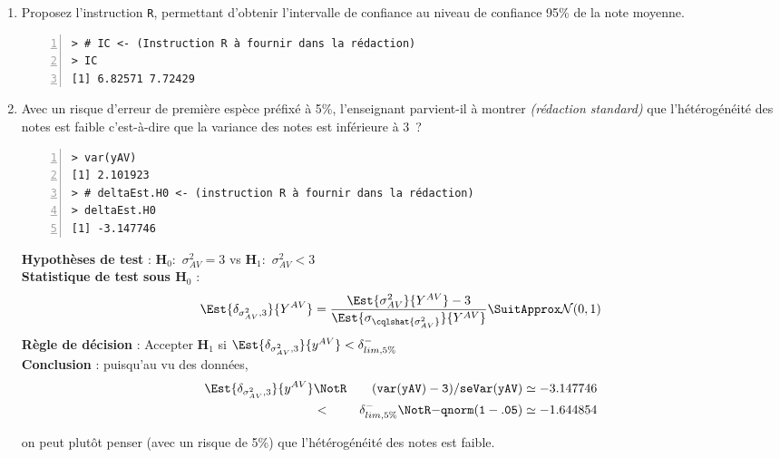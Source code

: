 \documentclass[10pt]{report}
\newcommand{\redstd}{\textit{(rédaction standard) }}
\begin{document}
\begin{exercice}
\begin{enumerate}
\item  
Proposez l'instruction \texttt{R}, permettant d'obtenir l'intervalle de confiance au niveau de confiance 95\% de la note moyenne.

\begin{Verbatim}[frame=leftline,fontfamily=tt,fontshape=n,numbers=left]
> # IC <- (Instruction R à fournir dans la rédaction)
> IC
[1] 6.82571 7.72429
\end{Verbatim}




\item 
Avec un risque d'erreur de premi{\`e}re esp{\`e}ce pr{\'e}fix{\'e} {\`a} 5\%, l'enseignant parvient-il {\`a} montrer \redstd que l'hétérogénéité des notes est faible c'est-à-dire que la variance des notes est inférieure à 3~?

\IndicR
\begin{Verbatim}[frame=leftline,fontfamily=tt,fontshape=n,numbers=left]
> var(yAV)
[1] 2.101923
> # deltaEst.H0 <- (instruction R à fournir dans la rédaction)
> deltaEst.H0
[1] -3.147746
\end{Verbatim}

 

\begin{Correction}

\noindent \textbf{Hypothèses de test} : $\mathbf{H}_0:$ $\sigma^2_{AV}=3$ vs {\large $\mathbf{H}_1:$ $\sigma^2_{AV}<3$}\\
\textbf{Statistique de test sous $\mathbf{H}_0$} :
  $$
  \Est{\delta_{\sigma^2_{AV},3}}{Y^{AV}}= {\displaystyle \frac{\Est{\sigma^2_{AV}}{Y^{AV}}-3}{
\Est{\sigma_{\cqlshat{\sigma^2_{AV}}}}{Y^{AV}}
}} 
  \SuitApprox \mathcal{N}(0,1)
  $$
\textbf{Règle de décision} : Accepter $\mathbf{H}_1$ si 
  $\Est{\delta_{\sigma^2_{AV},3}}{y^{AV}} < \delta^-_{lim,5\%}$\\
\noindent \textbf{Conclusion} :
puisqu'au vu des données, 
  \begin{eqnarray*}
\Est{\delta_{\sigma^2_{AV},3}}{y^{AV}} &\NotR&\mathtt{(var(yAV)-3)/seVar(yAV)}\simeq -3.147746\\& <  & \delta^-_{lim,5\%} \NotR \mathtt{-qnorm(1-.05)}\simeq-1.644854
\end{eqnarray*}
  
on peut plutôt penser (avec un risque de 5\%) que l'hétérogénéité des notes est faible.
\end{Correction}









\end{enumerate}
\end{exercice}
\end{document}

